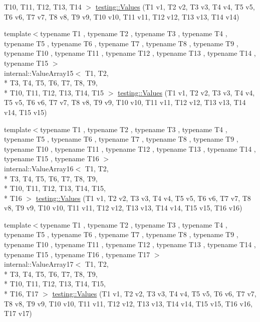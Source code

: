 \begin{DoxyCompactItemize}
T10, T11, T12, T13, T14 $>$ \hyperlink{namespacetesting_a2d00ed785e0e796e6f36dc79c051dc76}{testing\-::\-Values} (T1 v1, T2 v2, T3 v3, T4 v4, T5 v5, T6 v6, T7 v7, T8 v8, T9 v9, T10 v10, T11 v11, T12 v12, T13 v13, T14 v14)
\item 
{\footnotesize template$<$typename T1 , typename T2 , typename T3 , typename T4 , typename T5 , typename T6 , typename T7 , typename T8 , typename T9 , typename T10 , typename T11 , typename T12 , typename T13 , typename T14 , typename T15 $>$ }\\internal\-::\-Value\-Array15$<$ T1, T2, \\*
T3, T4, T5, T6, T7, T8, T9, \\*
T10, T11, T12, T13, T14, T15 $>$ \hyperlink{namespacetesting_ab0c1943e4f680df0d92c695ed0ac36df}{testing\-::\-Values} (T1 v1, T2 v2, T3 v3, T4 v4, T5 v5, T6 v6, T7 v7, T8 v8, T9 v9, T10 v10, T11 v11, T12 v12, T13 v13, T14 v14, T15 v15)
\item 
{\footnotesize template$<$typename T1 , typename T2 , typename T3 , typename T4 , typename T5 , typename T6 , typename T7 , typename T8 , typename T9 , typename T10 , typename T11 , typename T12 , typename T13 , typename T14 , typename T15 , typename T16 $>$ }\\internal\-::\-Value\-Array16$<$ T1, T2, \\*
T3, T4, T5, T6, T7, T8, T9, \\*
T10, T11, T12, T13, T14, T15, \\*
T16 $>$ \hyperlink{namespacetesting_afebcdc503d4a99cae5924523dcfd02e1}{testing\-::\-Values} (T1 v1, T2 v2, T3 v3, T4 v4, T5 v5, T6 v6, T7 v7, T8 v8, T9 v9, T10 v10, T11 v11, T12 v12, T13 v13, T14 v14, T15 v15, T16 v16)
\item 
{\footnotesize template$<$typename T1 , typename T2 , typename T3 , typename T4 , typename T5 , typename T6 , typename T7 , typename T8 , typename T9 , typename T10 , typename T11 , typename T12 , typename T13 , typename T14 , typename T15 , typename T16 , typename T17 $>$ }\\internal\-::\-Value\-Array17$<$ T1, T2, \\*
T3, T4, T5, T6, T7, T8, T9, \\*
T10, T11, T12, T13, T14, T15, \\*
T16, T17 $>$ \hyperlink{namespacetesting_a5cb89ee5c491cbe65de523f9f1bc1987}{testing\-::\-Values} (T1 v1, T2 v2, T3 v3, T4 v4, T5 v5, T6 v6, T7 v7, T8 v8, T9 v9, T10 v10, T11 v11, T12 v12, T13 v13, T14 v14, T15 v15, T16 v16, T17 v17)
\item 

\end{DoxyCompactItemize}
